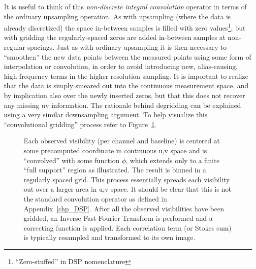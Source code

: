  It is useful to think of this \emph{non-discrete integral convolution} operator in terms of the ordinary upsampling operation. As with upsampling (where
 the data is already discretized) the space in-between samples is filled with zero values\footnote{``Zero-stuffed'' in DSP nomenclature}, but with gridding 
 the regularly-spaced zeros are added in-between samples at non-regular spacings. Just as with ordinary upsampling it is then necessary to ``smoothen'' the new data points 
 between the measured points using some form of interpolation or convolution, in order to avoid introducing new, alias-causing, high frequency terms in the 
 higher resolution sampling. It is important to realize that the data is simply smeared out into the continuous
 measurement space, and by implication also over the newly inserted zeros, but that this does not recover any missing uv information. The 
 rationale behind degridding can be explained using a very similar downsampling argument. To help visualize this ``convolutional gridding'' 
 process refer to Figure~\ref{fig_gridding}.
 \begin{figure}[h]
  \begin{mdframed}
   \caption[Illustration of convolutional gridding]{Each observed visibility (per channel and baseline) is centered at some precomputed coordinate in continuous u,v space and 
    is ``convolved'' with some function $\phi$, which extends only to a finite ``full support'' region as illustrated. The result is binned in a regularly spaced grid. 
    This process essentially spreads each visibility out over a larger area in u,v space. It should be clear that this is not the standard convolution 
    operator as defined in Appendix~\ref{chp_DSP}. After all the observed visibilities have been gridded, an Inverse Fast Fourier Transform is performed 
    and a correcting function is applied. Each correlation term (or Stokes sum) is typically resampled and transformed to its own image.}
   \label{fig_gridding}
  \end{mdframed}
 \end{figure}
 
